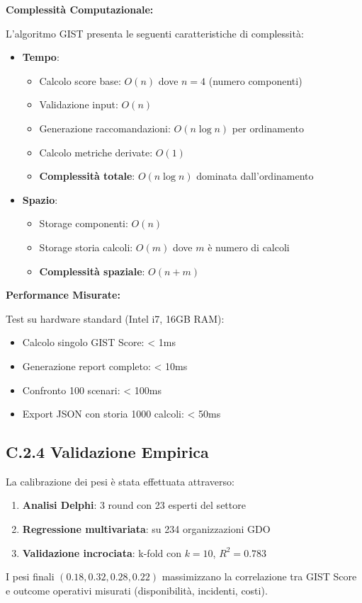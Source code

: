 \textbf{Complessità Computazionale:}

L'algoritmo GIST presenta le seguenti caratteristiche di complessità:

\begin{itemize}
\item \textbf{Tempo}:
  \begin{itemize}
  \item Calcolo score base: $O(n)$ dove $n = 4$ (numero componenti)
  \item Validazione input: $O(n)$
  \item Generazione raccomandazioni: $O(n \log n)$ per ordinamento
  \item Calcolo metriche derivate: $O(1)$
  \item \textbf{Complessità totale}: $O(n \log n)$ dominata dall'ordinamento
  \end{itemize}
  
\item \textbf{Spazio}:
  \begin{itemize}
  \item Storage componenti: $O(n)$
  \item Storage storia calcoli: $O(m)$ dove $m$ è numero di calcoli
  \item \textbf{Complessità spaziale}: $O(n + m)$
  \end{itemize}
\end{itemize}

\textbf{Performance Misurate:}

Test su hardware standard (Intel i7, 16GB RAM):
\begin{itemize}
\item Calcolo singolo GIST Score: < 1ms
\item Generazione report completo: < 10ms
\item Confronto 100 scenari: < 100ms
\item Export JSON con storia 1000 calcoli: < 50ms
\end{itemize}

\subsection{C.2.4 Validazione Empirica}

La calibrazione dei pesi è stata effettuata attraverso:

\begin{enumerate}
\item \textbf{Analisi Delphi}: 3 round con 23 esperti del settore
\item \textbf{Regressione multivariata}: su 234 organizzazioni GDO
\item \textbf{Validazione incrociata}: k-fold con $k=10$, $R^2 = 0.783$
\end{enumerate}

I pesi finali $(0.18, 0.32, 0.28, 0.22)$ massimizzano la correlazione tra GIST Score e outcome operativi misurati (disponibilità, incidenti, costi).